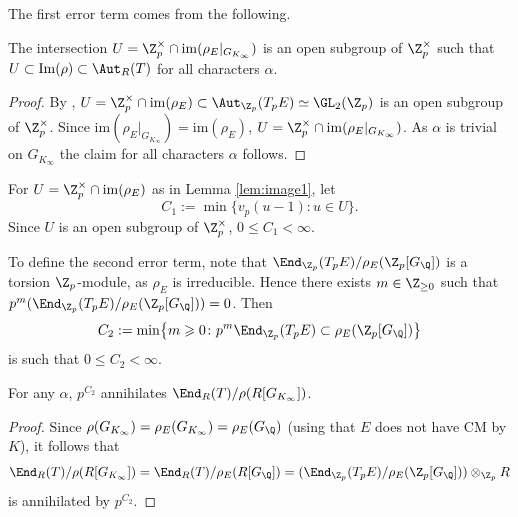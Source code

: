 The first error term comes from the following.

\begin{lemma}
\notready\label{lem:image1}
The intersection $U = \Z_p^\times\cap \mathrm{im}(\rho_E|_{G_{K_\infty}})$ is an open subgroup of $\Z_p^\times$
such that $U\subset \mathrm{Im}(\rho)\subset \Aut_R(T)$ for all characters $\alpha$.
\end{lemma}

\begin{proof}
By %
\cite[Prop.~(6.1.1)(i)]{nekovar}, $U=\Z_p^\times\cap \mathrm{im}(\rho_E)\subset \Aut_{\Z_p}(T_pE)\simeq \GL_2(\Z_p)$
is an open subgroup of $\Z_p^\times$. Since
$\mathrm{im}(\rho_E|_{G_{K_\infty}}) =  \mathrm{im}(\rho_E)$,
$U = \Z_p^\times\cap \mathrm{im}(\rho_E|_{G_{K_\infty}})$.
As $\alpha$ is trivial on $G_{K_\infty}$ the claim for all characters $\alpha$ follows.
\end{proof}

For $U = \Z_p^\times\cap \mathrm{im}(\rho_E)$ as in Lemma \ref{lem:image1}, let
\[
C_1 := \min\{v_p(u-1)\colon u\in U\}.
\]
Since $U$ is an open subgroup of $\Z_p^\times$, $0\leqslant C_1 < \infty$.

To define the second error term, note that $\End_{\Z_p}(T_pE)/\rho_E(\Z_p[G_{\Q}])$ is a torsion $\Z_p$-module, as $\rho_E$ is irreducible. Hence there exists $m\in\Z_{\geq 0}$ such that $p^m (\End_{\Z_p}(T_pE)/\rho_E(\Z_p[G_{\Q}]))=0$. Then
\[
C_2:=\min\bigl\{ m\geqslant 0 \colon p^m\End_{\Z_p}(T_pE)\subset\rho_E(\Z_p[G_{\Q}])\bigr\}
\]
is such that $0\leqslant C_2 <\infty$.

\begin{lemma}
\notready\label{lem:image2} For any $\alpha$,  $p^{C_2}$ annihilates
$\End_R(T)/\rho(R[G_{K_\infty}])$.
\end{lemma}

\begin{proof}
Since $\rho(G_{K_\infty}) = \rho_E(G_{K_\infty}) = \rho_E(G_\Q)$ (using that $E$ does not have CM by $K$), it follows that
$$
\End_R(T)/\rho(R[G_{K_\infty}]) = \End_R(T)/\rho_E(R[G_\Q]) = (\End_{\Z_p}(T_pE)/\rho_E(\Z_p[G_\Q]))\otimes_{\Z_p}R
$$
is annihilated by $p^{C_2}$.
\end{proof}

